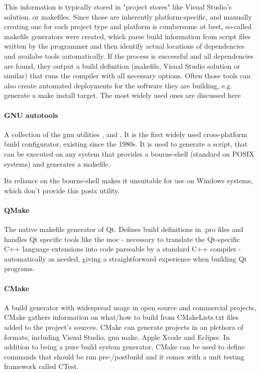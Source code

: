 This information is typically stored in "project stores" like Visual Studio's solution, or makefiles. Since those are inherently platform-specific, and manually creating one for each project type and platform is cumbersome at best, so-called makefile generators were created, which parse build information from script files written by the programmer and then identify actual locations of dependencies and availabe tools automatically. If the process is successful and all dependencies are found, they output a build definition (makefile, Visual Studio solution or similar) that runs the compiler with all necessary options. Often those tools can also create automated deployments for the software they are building, e.g. generate a make install target. The most widely used ones are discussed here

\paragraph{GNU autotools}
A collection of the \gls{gnu} utilities ,  and . It is the first widely used cross-platform build configurator, existing since the 1980s. It is used to generate a  script, that can be executed on any system that provides a bourne-shell (standard on POSIX systems) and generates a makefile.

Its reliance on the bourne-shell makes it unsuitable for use on Windows systems, which don't provide this \gls{posix} utility.

\paragraph{QMake}
The native makefile generator of Qt. Defines build definitions in .pro files and handles Qt specific tools like the \gls{moc} - necessary to translate the Qt-specific C++ language extensions into code parseable by a standard C++ compiler - automatically as needed, giving a straightforward experience when building Qt programs.

\paragraph{CMake}
A build generator with widespread usage in open source and commercial projects, CMake gathers information on what/how to build from CMakeLists.txt files added to the project's sources.
CMake can generate projects in an plethora of formats, including Visual Studio, \gls{gnu} make, Apple Xcode and Eclipse.
In addition to being a pure build system generator, CMake can be used to define commands that should be run pre-/postbuild and it comes with a unit testing framework called CTest.

